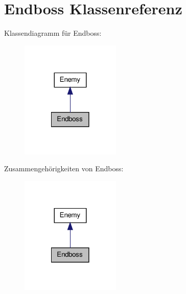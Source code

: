 \hypertarget{class_endboss}{\section{Endboss Klassenreferenz}
\label{class_endboss}
}


Klassendiagramm für Endboss\-:
\nopagebreak
\begin{figure}[H]
\begin{center}
\leavevmode
\includegraphics[width=134pt]{class_endboss__inherit__graph}
\end{center}
\end{figure}


Zusammengehörigkeiten von Endboss\-:
\nopagebreak
\begin{figure}[H]
\begin{center}
\leavevmode
\includegraphics[width=134pt]{class_endboss__coll__graph}
\end{center}
\end{figure}
